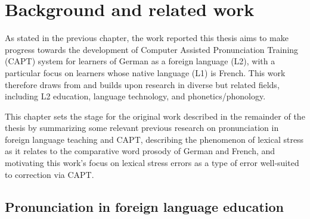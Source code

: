 %
%
\chapter{Background and related work}
\label{chap:background}


As stated in the previous chapter, the work reported this thesis aims to make progress towards the development of Computer Assisted Pronunciation Training (CAPT) system for learners of German as a foreign language (L2), with a particular focus on learners whose native language (L1) is French. This work therefore draws from and builds upon research in diverse but related fields, including L2 education, language technology, and phonetics/phonology.

This chapter sets the stage for the original work described in the remainder of the thesis by summarizing some relevant previous research on pronunciation in foreign language teaching and CAPT, describing the phenomenon of lexical stress as it relates to the comparative word prosody of German and French, and motivating this work's focus on lexical stress errors as a type of error well-suited to correction via CAPT.


	\section{Pronunciation in foreign language education}
	\label{sec:bkgd:l2ed}
%	


